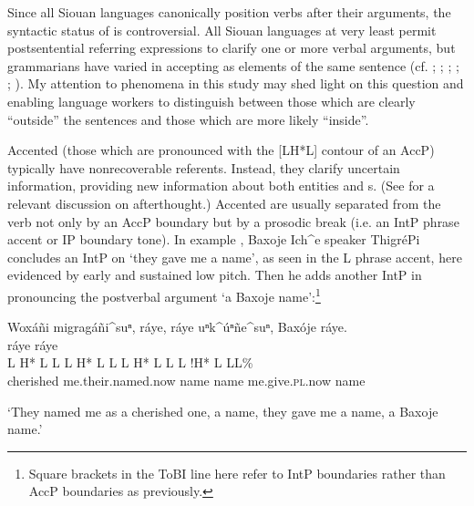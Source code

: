\documentclass[output=paper]{LSP/langsci}
\begin{document}
Since all Siouan languages canonically position verbs after their arguments, the syntactic status of  is controversial. All Siouan languages at very least permit postsentential referring expressions to clarify one or more verbal arguments, but grammarians have varied in accepting  as elements of the same sentence (cf. \citealt{Rudin1998}; \citealt{Mithun1999}; \citealt[76]{Ingham2003}; \citealt[421]{Cumberland2005}; \citealt[292--293]{Boyle2007}; \citealt{Gordon2008}). My attention to  phenomena in this study may shed light on this question and enabling language workers to distinguish between those  which are clearly “outside” the sentences and those which are more likely “inside”.

Accented  (those which are pronounced with the [LH*L] contour of an AccP) typically have nonrecoverable referents. Instead, they clarify uncertain information, providing new information about both entities and s. (See \citealt[103]{Graczyk1991a} for a relevant discussion on  afterthought.) Accented  are usually separated from the verb not only by an AccP boundary but by a prosodic break (i.e. an IntP phrase accent or IP boundary tone). In example , Baxoje Ich\^{}e speaker ThigréPi concludes an IntP on  `they gave me a name', as seen in the L phrase accent, here evidenced by early and sustained low pitch. Then he adds another IntP in pronouncing the postverbal argument  `a Baxoje name':\footnote{Square brackets in the ToBI line here refer to IntP boundaries rather than AccP boundaries as previously.}

\ea\label{thigrepiraye}
Woxáñi migragáñi\^{}suⁿ, ráye, ráye uⁿk\^{}úⁿñe\^{}suⁿ, Baxóje ráye.\rmfnm\\
\glll	{} 				ráye					ráye\\
	{\ob L H* L}		{L\cb}	{\ob L H* L L\cb}	{\ob L H* L}	{L\cb}	{\ob L !H* L} 		{L\cb{}L\%}\\
	cherished	me.their.named.now	name		name	me.give.\textsc{pl}.now				name\\

\glt	`They named me as a cherished one, a name, they gave me a name, a Baxoje name.'
\z
\end{document}
